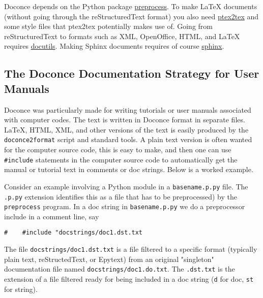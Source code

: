 \documentclass{article}
\begin{document}
Doconce depends on the Python package
\href{http://code.google.com/p/preprocess/}{preprocess}.  To make {\LaTeX}
documents (without going through the reStructuredText format) you also
need \href{http://code.google.com/p/ptex2tex}{ptex2tex} and some style files
that ptex2tex potentially makes use of.  Going from reStructuredText
to formats such as XML, OpenOffice, HTML, and {\LaTeX} requires
\href{http://docutils.sourceforge.net/}{docutils}.  Making Sphinx documents
requires of course \href{http://sphinx.pocoo.org}{sphinx}.

\subsection{The Doconce Documentation Strategy for User Manuals}

Doconce was particularly made for writing tutorials or user manuals
associated with computer codes. The text is written in Doconce format
in separate files. {\LaTeX}, HTML, XML, and other versions of the text
is easily produced by the {\fontsize{10pt}{10pt}\verb!doconce2format!} script and standard tools.
A plain text version is often wanted for the computer source code,
this is easy to make, and then one can use
{\fontsize{10pt}{10pt}\verb!#include!} statements in the computer source code to automatically
get the manual or tutorial text in comments or doc strings.
Below is a worked example.

Consider an example involving a Python module in a {\fontsize{10pt}{10pt}\verb!basename.p.py!} file.
The {\fontsize{10pt}{10pt}\verb!.p.py!} extension identifies this as a file that has to be
preprocessed) by the {\fontsize{10pt}{10pt}\verb!preprocess!} program. 
In a doc string in {\fontsize{10pt}{10pt}\verb!basename.p.py!} we do a preprocessor include
in a comment line, say
\begin{Verbatim}[fontsize=\fontsize{9pt}{9pt},tabsize=8,baselinestretch=0.85,
fontfamily=tt,xleftmargin=7mm]
#    #include "docstrings/doc1.dst.txt
\end{Verbatim}
\noindent
% 
% 
The file {\fontsize{10pt}{10pt}\verb!docstrings/doc1.dst.txt!} is a file filtered to a specific format
(typically plain text, reStructedText, or Epytext) from an original
"singleton" documentation file named {\fontsize{10pt}{10pt}\verb!docstrings/doc1.do.txt!}. The {\fontsize{10pt}{10pt}\verb!.dst.txt!}
is the extension of a file filtered ready for being included in a doc
string ({\fontsize{10pt}{10pt}\verb!d!} for doc, {\fontsize{10pt}{10pt}\verb!st!} for string).
\end{document}
